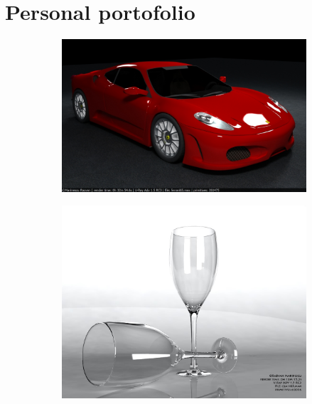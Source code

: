 \documentclass[11pt,a4paper]{report}
\begin{document}
\section*{Personal portofolio}

\begin{figure}[H]
 \begin{subfigure}{0.47\textwidth}
 \centering
 \vspace{1em}
  \includegraphics[width=\textwidth]{images/ferrari1440x900.jpg}
 \end{subfigure}
 \begin{subfigure}{0.47\textwidth}
 \centering
  \includegraphics[width=\textwidth]{images/glass03.jpg}
 \end{subfigure}
 

\end{figure}
\end{document}
